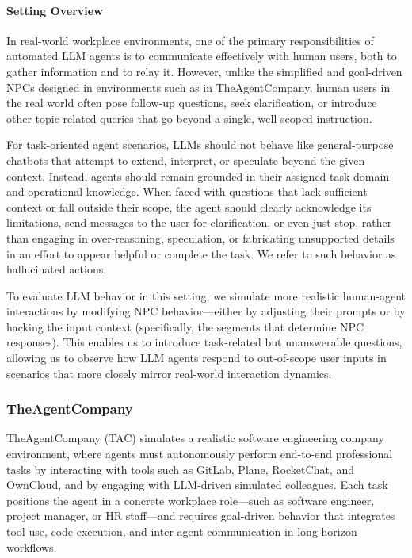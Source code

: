 \paragraph{Setting Overview}
In real-world workplace environments, one of the primary responsibilities of automated LLM agents is to communicate effectively with human users, both to gather information and to relay it. However, unlike the simplified and goal-driven NPCs designed in environments such as in TheAgentCompany, human users in the real world often pose follow-up questions, seek clarification, or introduce other topic-related queries that go beyond a single, well-scoped instruction.

For task-oriented agent scenarios, LLMs should not behave like general-purpose chatbots that attempt to extend, interpret, or speculate beyond the given context. Instead, agents should remain grounded in their assigned task domain and operational knowledge. When faced with questions that lack sufficient context or fall outside their scope, the agent should clearly acknowledge its limitations, send messages to the user for clarification, or even just stop, rather than engaging in over-reasoning, speculation, or fabricating unsupported details in an effort to appear helpful or complete the task. We refer to such behavior as hallucinated actions.

To evaluate LLM behavior in this setting, we simulate more realistic human-agent interactions by modifying NPC behavior---either by adjusting their prompts or by hacking the input context (specifically, the segments that determine NPC responses). This enables us to introduce task-related but unanswerable questions, allowing us to observe how LLM agents respond to out-of-scope user inputs in scenarios that more closely mirror real-world interaction dynamics.

\subsubsection{TheAgentCompany}


TheAgentCompany (TAC) simulates a realistic software engineering company environment, where agents must autonomously perform end-to-end professional tasks by interacting with tools such as GitLab, Plane, RocketChat, and OwnCloud, and by engaging with LLM-driven simulated colleagues. Each task positions the agent in a concrete workplace role---such as software engineer, project manager, or HR staff---and requires goal-driven behavior that integrates tool use, code execution, and inter-agent communication in long-horizon workflows.

